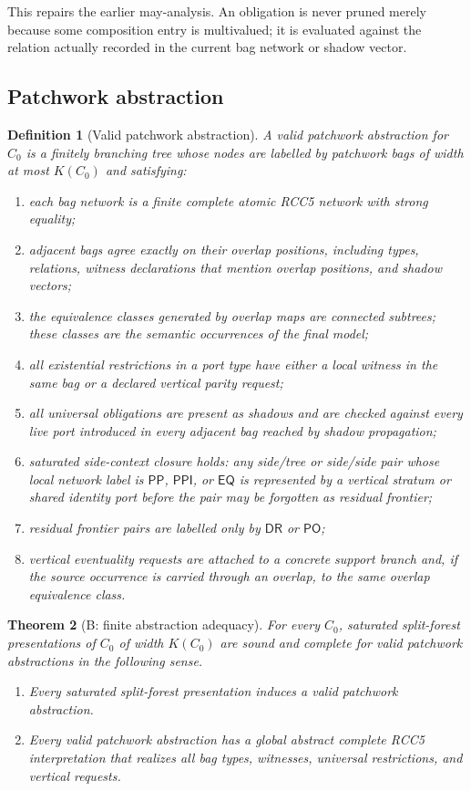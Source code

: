 \documentclass[11pt]{article}
\newtheorem{theorem}{Theorem}[section]
\newtheorem{definition}[theorem]{Definition}
\newcommand{\EQ}{\mathsf{EQ}}
\newcommand{\PP}{\mathsf{PP}}
\newcommand{\PPI}{\mathsf{PPI}}
\newcommand{\PO}{\mathsf{PO}}
\newcommand{\DR}{\mathsf{DR}}
\begin{document}
This repairs the earlier may-analysis.  An obligation is never pruned merely because some
composition entry is multivalued; it is evaluated against the relation actually recorded
in the current bag network or shadow vector.

\subsection{Patchwork abstraction}

\begin{definition}[Valid patchwork abstraction]\label{def:valid-abstraction}
A valid patchwork abstraction for $C_0$ is a finitely branching tree whose nodes are
labelled by patchwork bags of width at most $K(C_0)$ and satisfying:
\begin{enumerate}[label=(A\arabic*)]
\item each bag network is a finite complete atomic RCC5 network with strong equality;
\item adjacent bags agree exactly on their overlap positions, including types,
relations, witness declarations that mention overlap positions, and shadow vectors;
\item the equivalence classes generated by overlap maps are connected subtrees; these
classes are the semantic occurrences of the final model;
\item all existential restrictions in a port type have either a local witness in the same
bag or a declared vertical parity request;
\item all universal obligations are present as shadows and are checked against every live
port introduced in every adjacent bag reached by shadow propagation;
\item saturated side-context closure holds: any side/tree or side/side pair whose local
network label is $\PP$, $\PPI$, or $\EQ$ is represented by a vertical stratum or shared
identity port before the pair may be forgotten as residual frontier;
\item residual frontier pairs are labelled only by $\DR$ or $\PO$;
\item vertical eventuality requests are attached to a concrete support branch and, if the
source occurrence is carried through an overlap, to the same overlap equivalence class.
\end{enumerate}
\end{definition}

\begin{theorem}[B: finite abstraction adequacy]\label{thm:B}
For every $C_0$, saturated split-forest presentations of $C_0$ of width $K(C_0)$ are sound
and complete for valid patchwork abstractions in the following sense.
\begin{enumerate}[label=(\alph*)]
\item Every saturated split-forest presentation induces a valid patchwork abstraction.
\item Every valid patchwork abstraction has a global abstract complete RCC5 interpretation
that realizes all bag types, witnesses, universal restrictions, and vertical requests.
\end{enumerate}
\end{theorem}
\end{document}
